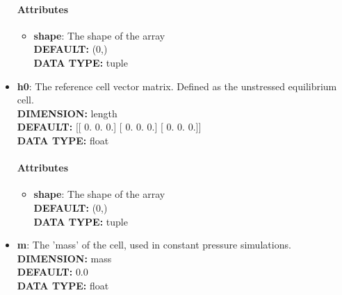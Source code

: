 \begin{itemize}
\paragraph{Attributes}
 \begin{itemize}
\item {\bf shape}:
 The shape of the array
{\\ \bf DEFAULT: }(0,)
{\\ \bf DATA TYPE: }tuple
\end{itemize}
 
\item {\bf h0}:
 The reference cell vector matrix. Defined as the unstressed equilibrium cell.
{\\ \bf DIMENSION: }length
{\\ \bf DEFAULT: }
      [[ 0.  0.  0.]
       [ 0.  0.  0.]
       [ 0.  0.  0.]]
{\\ \bf DATA TYPE: }float
\paragraph{Attributes}
 \begin{itemize}
\item {\bf shape}:
 The shape of the array
{\\ \bf DEFAULT: }(0,)
{\\ \bf DATA TYPE: }tuple
\end{itemize}
 
\item {\bf m}:
 The 'mass' of the cell, used in constant pressure simulations.
{\\ \bf DIMENSION: }mass
{\\ \bf DEFAULT: }0.0
{\\ \bf DATA TYPE: }float
\end{itemize}
 
